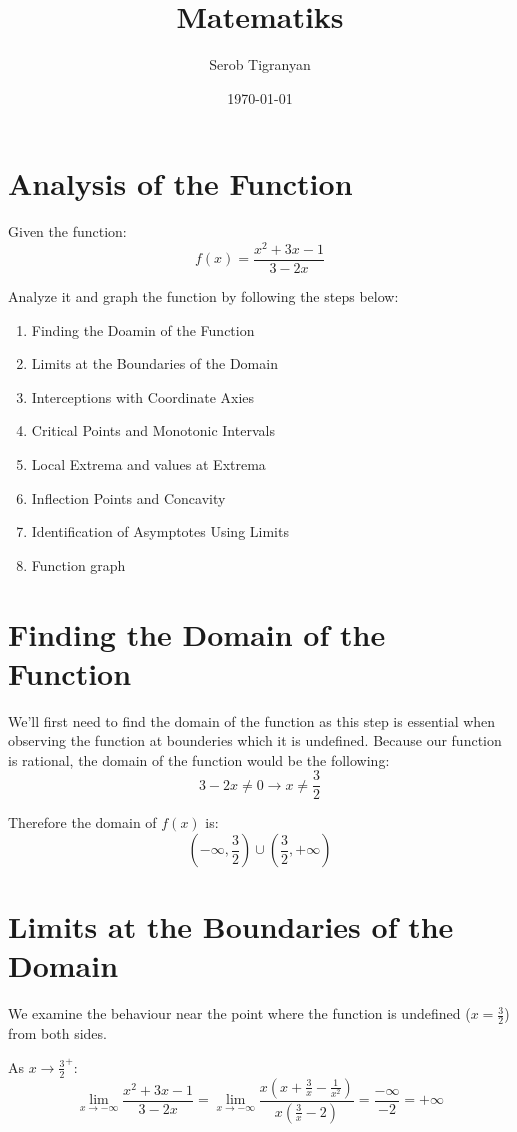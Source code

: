 \documentclass[11pt]{article}
\author{Serob Tigranyan}
\date{\today}
\title{Matematiks}
\begin{document}
\maketitle
\tableofcontents

\newpage
\section{Analysis of the Function}
\label{sec:orge65d9a3}
Given the function:
\[
f(x)=\frac{x^2+3x-1}{3-2x}
\]

Analyze it and graph the function by following the steps below:
\begin{enumerate}
\item Finding the Doamin of the Function
\item Limits at the Boundaries of the Domain
\item Interceptions with Coordinate Axies
\item Critical Points and Monotonic Intervals
\item Local Extrema and values at Extrema
\item Inflection Points and Concavity
\item Identification of Asymptotes Using Limits
\item Function graph
\end{enumerate}
\section{Finding the Domain of the Function}
\label{sec:orga637b0a}
We'll first need to find the domain of the function as this step is essential when observing the function at bounderies which it is undefined.
Because our function is rational, the domain of the function would be the following:
\[
3-2x \neq 0 \rightarrow x \neq \frac{3}{2}
\]

Therefore the domain of \(f(x)\) is:
\[
\left(-\infty, \frac{3}{2} \right) \cup \left( \frac{3}{2}, +\infty \right)
\]

\newpage
\section{Limits at the Boundaries of the Domain}
\label{sec:org04da1c5}
We examine the behaviour near the point where the function is undefined (\(x=\frac{3}{2}\)) from both sides.

As \(x \to \frac{3}{2}^+\):
\[
\lim_{x \to -\infty} \frac{x^2+3x-1}{3-2x} = \lim_{x \to -\infty} \frac{x \left( x + \frac{3}{x} - \frac{1}{x^2} \right)}{ x \left( \frac{3}{x} - 2 \right) } = \frac{-\infty}{-2} = +\infty
\]
\end{document}

